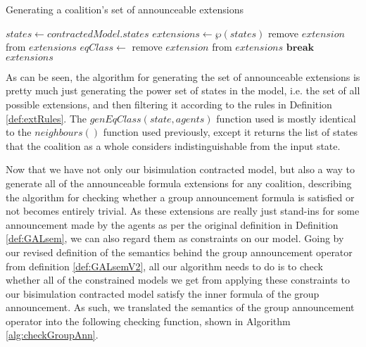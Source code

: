 \begin{algorithm}
	\caption{Generating a coalition's set of announceable extensions}
	\label{alg:genAnnExts}
	\begin{algorithmic}
			\State $states \gets contractedModel.states$
			\State $extensions \gets \wp(states)$
					\State remove $extension$ from $extensions$
				\Else
						\State $eqClass \gets $
								\State remove $extension$ from $extensions$
								\State $\mathbf{break}$
							\EndIf
						\EndFor
					\EndFor
				\EndIf				
			\EndFor
			\State \Return $extensions$
		\EndFunction
	\end{algorithmic}
\end{algorithm}

As can be seen, the algorithm for generating the set of announceable extensions is pretty much just generating the power set of states in the model, i.e. the set of all possible extensions, and then filtering it according to the rules in Definition \ref{def:extRules}. The $genEqClass(state, agents)$ function used is mostly identical to the $neighbours()$ function used previously, except it returns the list of states that the coalition as a whole considers indistinguishable from the input state. 

Now that we have not only our bisimulation contracted model, but also a way to generate all of the announceable formula extensions for any coalition, describing the algorithm for checking whether a group announcement formula is satisfied or not becomes entirely trivial. As these extensions are really just stand-ins for some announcement made by the agents as per the original definition in Definition \ref{def:GALsem}, we can also regard them as constraints on our model. Going by our revised definition of the semantics behind the group announcement operator from definition \ref{def:GALsemV2}, all our algorithm needs to do is to check whether all of the constrained models we get from applying these constraints to our bisimulation contracted model satisfy the inner formula  of the group announcement. As such, we translated the semantics of the group announcement operator into the following checking function, shown in Algorithm \ref{alg:checkGroupAnn}.

